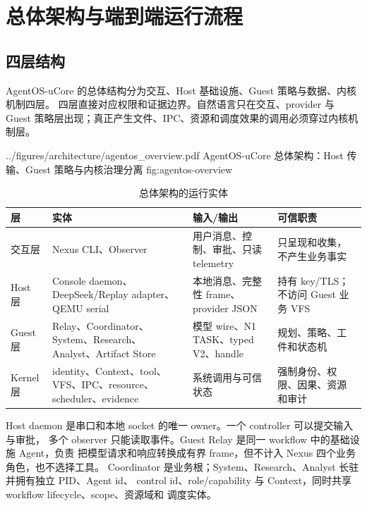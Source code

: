 \chapter{总体架构与端到端运行流程}
\label{chap:architecture}

\section{四层结构}

AgentOS-uCore 的总体结构分为交互、Host 基础设施、Guest 策略与数据、内核机制四层。
四层直接对应权限和证据边界。自然语言只在交互、provider 与
Guest 策略层出现；真正产生文件、IPC、资源和调度效果的调用必须穿过内核机制层。

  {../figures/architecture/agentos_overview.pdf}
  {AgentOS-uCore 总体架构：Host 传输、Guest 策略与内核治理分离}
  {fig:agentos-overview}

\begin{table}[htbp]
\centering
\caption{总体架构的运行实体}
\label{tab:architecture-entities}
\begin{tabularx}{\textwidth}{L{2.5cm}L{3.4cm}YY}
\toprule
\textbf{层} & \textbf{实体} & \textbf{输入/输出} & \textbf{可信职责} \\
\midrule
交互层 & Nexus CLI、Observer & 用户消息、控制、审批、只读 telemetry &
只呈现和收集，不产生业务事实 \\
Host 层 & Console daemon、DeepSeek/Replay adapter、QEMU serial &
本地消息、完整性 frame、provider JSON & 持有 key/TLS；不访问 Guest 业务 VFS \\
Guest 层 & Relay、Coordinator、System、Research、Analyst、Artifact Store &
模型 wire、N1 TASK、typed V2、handle & 规划、策略、工件和状态机 \\
Kernel 层 & identity、Context、tool、VFS、IPC、resource、scheduler、evidence &
系统调用与可信状态 & 强制身份、权限、因果、资源和审计 \\
\bottomrule
\end{tabularx}
\end{table}

Host daemon 是串口和本地 socket 的唯一 owner。一个 controller 可以提交输入与审批，
多个 observer 只能读取事件。Guest Relay 是同一 workflow 中的基础设施 Agent，负责
把模型请求和响应转换成有界 frame，但不计入 Nexus 四个业务角色，也不选择工具。
Coordinator 是业务根；System、Research、Analyst 长驻并拥有独立 PID、Agent id、
control id、role/capability 与 Context，同时共享 workflow lifecycle、scope、资源域和
调度实体。

